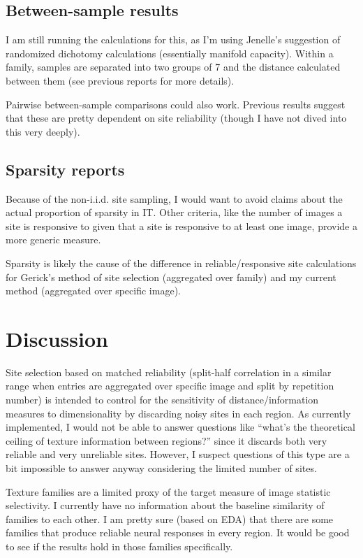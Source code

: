 \documentclass[
  11pt,
  letterpaper,
  DIV=11,
  numbers=noendperiod]{scrartcl}
\begin{document}
\subsection{Between-sample results}\label{between-sample-results}

I am still running the calculations for this, as I'm using Jenelle's
suggestion of randomized dichotomy calculations (essentially manifold
capacity). Within a family, samples are separated into two groups of 7
and the distance calculated between them (see previous reports for more
details).

Pairwise between-sample comparisons could also work. Previous results
suggest that these are pretty dependent on site reliability (though I
have not dived into this very deeply).

\subsection{Sparsity reports}\label{sparsity-reports}

Because of the non-i.i.d. site sampling, I would want to avoid claims
about the actual proportion of sparsity in IT. Other criteria, like the
number of images a site is responsive to given that a site is responsive
to at least one image, provide a more generic measure.

Sparsity is likely the cause of the difference in reliable/responsive
site calculations for Gerick's method of site selection (aggregated over
family) and my current method (aggregated over specific image).

\section{Discussion}\label{discussion}

Site selection based on matched reliability (split-half correlation in a
similar range when entries are aggregated over specific image and split
by repetition number) is intended to control for the sensitivity of
distance/information measures to dimensionality by discarding noisy
sites in each region. As currently implemented, I would not be able to
answer questions like ``what's the theoretical ceiling of texture
information between regions?'' since it discards both very reliable and
very unreliable sites. However, I suspect questions of this type are a
bit impossible to answer anyway considering the limited number of sites.

Texture families are a limited proxy of the target measure of image
statistic selectivity. I currently have no information about the
baseline similarity of families to each other. I am pretty sure (based
on EDA) that there are some families that produce reliable neural
responses in every region. It would be good to see if the results hold
in those families specifically.
\end{document}
